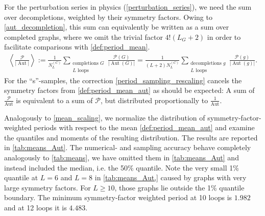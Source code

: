 \documentclass[12pt,a4paper]{article}
\newcommand{\abs}[1]{\lvert #1 \rvert}
\newcommand{\period}{\mathcal P}
\newcommand{\Aut}{\operatorname{Aut}}
\renewcommand{\|}{\rule[-0.4ex]{0.2ex}{1.2em}}
\begin{document}
For the   perturbation series in physics (\cref{perturbation_series}), we need the sum over decompletions, weighted by their symmetry factors. Owing to \cref{aut_decompletion}, this sum can equivalently be written as a sum over completed graphs, where we omit the trivial factor  $4! (L_G+2)$ in order to facilitate comparisons with \cref{def:period_mean}. 
\begin{align}\label{def:period_mean_aut}
	\left \langle \frac{\period}{\abs{\Aut}}  \right \rangle  :=  \frac{1}{N^{(C)}_L}\sum_{\substack{ \text{completions }G \\ L \text{ loops} }} \frac{\period (G)}{\abs{\Aut (G)}} = \frac{1}{(L+2) N^{(C)}_L  } \sum_{\substack{ \text{decompletions }g \\ L \text{ loops} }} \frac{\period (g)}{\abs{\Aut (g)}}  . 
\end{align}
For the \enquote{s}-samples, the correction \cref{period_sampling_rescaling} cancels the symmetry factors from \cref{def:period_mean_aut} as should be expected: A sum of $\frac{\period}{\Aut}$ is equivalent to a sum of $\period$, but distributed proportionally to $\frac{1}{\Aut}$.

Analogously to \cref{mean_scaling}, we normalize the distribution of symmetry-factor-weighted periods with respect to the mean \cref{def:period_mean_aut} and examine the quantiles and moments of the resulting distribution. The results are reported in \cref{tab:means_Aut}. The numerical- and sampling accuracy behave completely analogously to \cref{tab:means}, we have omitted them in \cref{tab:means_Aut} and instead included the median, i.e. the 50\% quantile.  Note the very small 1\% quantile at $L=6$ and $L=8$ in \cref{tab:means_Aut,} caused by graphs with very large symmetry factors. For $L \geq 10$, those graphs lie outside the 1\% quantile boundary. The minimum symmetry-factor weighted period at 10 loops is $1.982$ and at 12 loops it is $4.483$.
\end{document}
